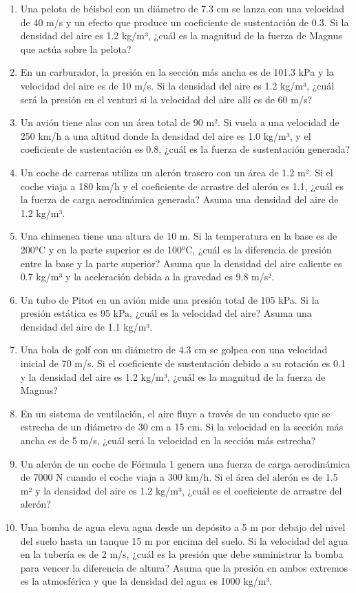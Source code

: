\documentclass[../main]{subfiles}
\begin{document}
\begin{enumerate}
\item Una pelota de béisbol con un diámetro de 7.3 cm se lanza con una velocidad de 40 m/s y un efecto que produce un coeficiente de sustentación de 0.3. Si la densidad del aire es 1.2 kg/m³, ¿cuál es la magnitud de la fuerza de Magnus que actúa sobre la pelota?
\item En un carburador, la presión en la sección más ancha es de 101.3 kPa y la velocidad del aire es de 10 m/s. Si la densidad del aire es 1.2 kg/m³, ¿cuál será la presión en el venturi si la velocidad del aire allí es de 60 m/s?
\item Un avión tiene alas con un área total de 90 m². Si vuela a una velocidad de 250 km/h a una altitud donde la densidad del aire es 1.0 kg/m³, y el coeficiente de sustentación es 0.8, ¿cuál es la fuerza de sustentación generada?
\item Un coche de carreras utiliza un alerón trasero con un área de 1.2 m². Si el coche viaja a 180 km/h y el coeficiente de arrastre del alerón es 1.1, ¿cuál es la fuerza de carga aerodinámica generada? Asuma una densidad del aire de 1.2 kg/m³.
\item Una chimenea tiene una altura de 10 m. Si la temperatura en la base es de 200°C y en la parte superior es de 100°C, ¿cuál es la diferencia de presión entre la base y la parte superior? Asuma que la densidad del aire caliente es 0.7 kg/m³ y la aceleración debida a la gravedad es 9.8 m/s².
\item Un tubo de Pitot en un avión mide una presión total de 105 kPa. Si la presión estática es 95 kPa, ¿cuál es la velocidad del aire? Asuma una densidad del aire de 1.1 kg/m³.
\item Una bola de golf con un diámetro de 4.3 cm se golpea con una velocidad inicial de 70 m/s. Si el coeficiente de sustentación debido a su rotación es 0.1 y la densidad del aire es 1.2 kg/m³, ¿cuál es la magnitud de la fuerza de Magnus?
\item En un sistema de ventilación, el aire fluye a través de un conducto que se estrecha de un diámetro de 30 cm a 15 cm. Si la velocidad en la sección más ancha es de 5 m/s, ¿cuál será la velocidad en la sección más estrecha?
\item Un alerón de un coche de Fórmula 1 genera una fuerza de carga aerodinámica de 7000 N cuando el coche viaja a 300 km/h. Si el área del alerón es de 1.5 m² y la densidad del aire es 1.2 kg/m³, ¿cuál es el coeficiente de arrastre del alerón?
\item Una bomba de agua eleva agua desde un depósito a 5 m por debajo del nivel del suelo hasta un tanque 15 m por encima del suelo. Si la velocidad del agua en la tubería es de 2 m/s, ¿cuál es la presión que debe suministrar la bomba para vencer la diferencia de altura? Asuma que la presión en ambos extremos es la atmosférica y que la densidad del agua es 1000 kg/m³.
\end{enumerate}
\end{document}
